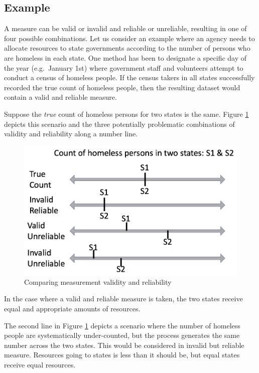 \documentclass[
]{book}
\begin{document}
\hypertarget{example}{%
\subsection{Example}\label{example}}

A measure can be valid or invalid and reliable or unreliable, resulting in one of four possible combinations. Let us consider an example where an agency needs to allocate resources to state governments according to the number of persons who are homeless in each state. One method has been to designate a specific day of the year (e.g.~January 1st) where government staff and volunteers attempt to conduct a census of homeless people. If the census takers in all states successfully recorded the true count of homeless people, then the resulting dataset would contain a valid and reliable measure.

Suppose the \emph{true} count of homeless persons for two states is the same. Figure \ref{fig:homeless} depicts this scenario and the three potentially problematic combinations of validity and reliability along a number line.

\begin{figure}

{\centering \includegraphics[width=\textwidth]{images/measure_lines} 

}

\caption{Comparing measurement validity and reliability}\label{fig:homeless}
\end{figure}

In the case where a valid and reliable measure is taken, the two states receive equal and appropriate amounts of resources.

The second line in Figure \ref{fig:homeless} depicts a scenario where the number of homeless people are systematically under-counted, but the process generates the same number across the two states. This would be considered in invalid but reliable measure. Resources going to states is less than it should be, but equal states receive equal resources.
\end{document}
